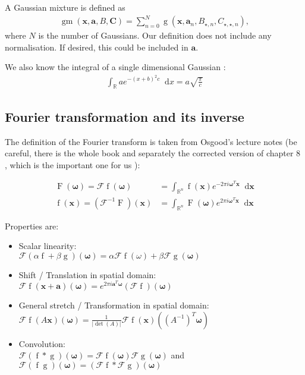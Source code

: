 \documentclass{paper}
\newcommand{\abs}[1]{\left| #1 \right|}
\newcommand{\F}{\ensuremath{\mathcal{F}}}
\newcommand{\vr}[1]{\ensuremath{\boldsymbol{#1}}}
\newcommand{\tr}[1]{\ensuremath{\boldsymbol{#1}}}
\newcommand{\f}[1]{\operatorname{#1}}
\newcommand*\diff{\mathop{}\!\mathrm{d}}
\newcommand{\omegavec}[0]{\ensuremath{\vr{\omega{}}}}
\newcommand{\avec}[0]{\ensuremath{\vr{a}}}
\newcommand{\xvec}[0]{\ensuremath{\vr{x}}}
\begin{document}
A Gaussian mixture is defined as
\begin{align}
	\f{gm}(\vr{x}, \vr{a}, B, \tr{C}) = \sum_{n=0}^{N} \f{g}(\vr{x}, \vr{a}_n, B_{\star, n}, C_{\star, \star, n}),
\end{align}
where $N$ is the number of Gaussians.
Our definition does not include any normalisation.
If desired, this could be included in $\vr{a}$.

We also know the integral of a single dimensional Gaussian \cite{wiki_gaussian_int}:
\begin{align}
	\label{eq:gaussian_integral}
	\int_{\mathbb{R}} a e^{-(x+b)^2 c} \diff x = a\sqrt{\frac{\pi}{c}}
\end{align}

\subsection*{Fourier transformation and its inverse}
The definition of the Fourier transform is taken from Osgood's lecture notes (be careful, there is the whole book \cite{osgood_book} and separately the corrected version of chapter 8 \cite{osgood_chapter8}, which is the important one for us ):

\begin{align}
	\f{F} (\vr{\omega}) = \F \f{f} (\vr{\omega}) &= \int_{\mathbb{R}^n} \f{f}(\vr{x}) e^{-2 \pi i \vr{\omega}^T \vr{x}} \diff \vr{x} \\
	\f{f} (\vr{x}) = (\F^{-1} \f{F}) (\vr{x}) &= \int_{\mathbb{R}^n} \f{F}(\vr{\omega}) e^{2 \pi i \vr{\omega}^T \vr{x}} \diff \vr{x}
\end{align}

Properties are:
\begin{itemize}
	\item Scalar linearity: \\
	      $\F(\alpha \f{f} + \beta \f{g})(\omegavec) = \alpha \F \f{f}(\omega) + \beta \F \f{g}(\omegavec)$
	\item Shift / Translation in spatial domain: \\
	      $\F\f{f}(\xvec + \avec)(\omegavec) = e^{2 \pi i \avec^T \omegavec} (\F \f{f})(\omegavec)$
	\item General stretch / Transformation in spatial domain:\\
		  $\F\f{f}(A\vr{x})(\omegavec) = \frac{1}{\abs{\det(A)}} \F \f{f}(\xvec)((A^{-1})^T\omegavec)$
	\item Convolution:\\
		  $\F(\f{f}\ast\f{g})(\omegavec) = \F\f{f}(\omegavec) \F\f{g}(\omegavec)$ and $\F(\f{f}\f{g})(\omegavec) = (\F\f{f} \ast \F\f{g})(\omegavec)$
\end{itemize}
\end{document}
